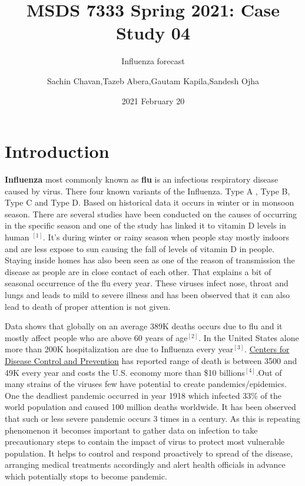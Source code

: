 \documentclass[
]{article}
\title{MSDS 7333 Spring 2021: Case Study 04}
\subtitle{Influenza forecast}
\author{Sachin Chavan,Tazeb Abera,Gautam Kapila,Sandesh Ojha}
\date{2021 February 20}
\begin{document}
\maketitle

\hypertarget{introduction}{%
\section{Introduction}\label{introduction}}

\textbf{Influenza} most commonly known as \textbf{flu} is an infectious
respiratory disease caused by virus. There four known variants of the
Influenza. Type A , Type B, Type C and Type D. Based on historical data
it occurs in winter or in monsoon season. There are several studies have
been conducted on the causes of occurring in the specific season and one
of the study has linked it to vitamin D levels in human
\protect\hyperlink{references}{\(^{[1]}\)}. It's during winter or rainy
season when people stay mostly indoors and are less expose to sun
causing the fall of levels of vitamin D in people. Staying inside homes
has also been seen as one of the reason of transmission the disease as
people are in close contact of each other. That explains a bit of
seasonal occurrence of the flu every year. These viruses infect nose,
throat and lungs and leads to mild to severe illness and has been
observed that it can also lead to death of proper attention is not
given.

Data shows that globally on an average 389K deaths occurs due to flu and
it mostly affect people who are above 60 years of
age\protect\hyperlink{references}{\(^{[2]}\)}. In the United States
alone more than 200K hospitalization are due to Influenza every
year\protect\hyperlink{references}{\(^{[3]}\)}.
\href{https://www.cdc.gov/}{Centers for Disease Control and Prevention}
has reported range of death is between 3500 and 49K every year and costs
the U.S. economy more than \$10
billions\protect\hyperlink{references}{\(^{[4]}\)}.Out of many strains
of the viruses few have potential to create pandemics/epidemics. One the
deadliest pandemic occurred in year 1918 which infected 33\% of the
world population and caused 100 million deaths worldwide. It has been
observed that such or less severe pandemic occurs 3 times in a century.
As this is repeating phenomenon it becomes important to gather data on
infection to take precautionary steps to contain the impact of virus to
protect most vulnerable population. It helps to control and respond
proactively to spread of the disease, arranging medical treatments
accordingly and alert health officials in advance which potentially
stops to become pandemic.
\end{document}
